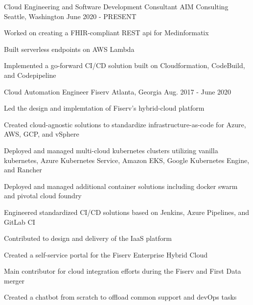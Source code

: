 


\begin{cventries}


\cventry
{Cloud Engineering and Software Development Consultant} %
{AIM Consulting} %
{Seattle, Washington} %
{June 2020 - PRESENT} %
{ %
\begin{cvitems}
\item {Worked on creating a FHIR-compliant REST api for Medinformatix}
\item {Built serverless endpoints on AWS Lambda}
\item {Implemented a go-forward CI/CD solution built on Cloudformation, CodeBuild, and Codepipeline}
\end{cvitems}
}


\cventry
{Cloud Automation Engineer} %
{Fiserv} %
{Atlanta, Georgia} %
{Aug. 2017 - June 2020} %
{ %
\begin{cvitems}
\item {Led the design and implemtation of Fiserv's hybrid-cloud platform}
\item {Created cloud-agnostic solutions to standardize infrastructure-as-code for Azure, AWS, GCP, and vSphere}
\item {Deployed and managed multi-cloud kubernetes clusters utilizing vanilla kubernetes, Azure Kubernetes Service, Amazon EKS, Google Kubernetes Engine, and Rancher}
\item {Deployed and managed additional container solutions including docker swarm and pivotal cloud foundry}
\item {Engineered standardized CI/CD solutions based on Jenkins, Azure Pipelines, and GitLab CI}
\item {Contributed to design and delivery of the IaaS platform}
\item {Created a self-service portal for the Fiserv Enterprise Hybrid Cloud}
\item {Main contributor for cloud integration efforts during the Fiserv and First Data merger}
\item {Created a chatbot from scratch to offload common support and devOps tasks}
\end{cvitems}
}


\end{cventries}
